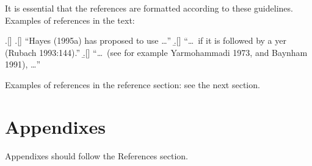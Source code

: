 \documentclass[times,linguex]{lsb}
\begin{document}
It is essential that the references are formatted according to these guidelines. Examples of references in the text:

\ex.[]
\a.[] ``Hayes (1995a) has proposed to use \ldots''
\b.[] ``\ldots\ if it is followed by a yer (Rubach 1993:144).''
\b.[] ``\ldots\ (see for example Yarmohammadi 1973, and Baynham 1991), \ldots''

Examples of references in the reference section: see the next section.


\nocite{*} %

\section{Appendixes}

Appendixes should follow the References section.
\end{document}
